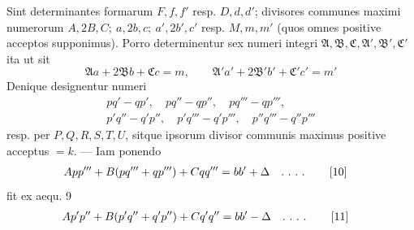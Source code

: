 Sint determinantes formarum $F,f,f'$ resp. $D,d,d'$; divisores communes maximi numerorum $A,2B,C;\ a,2b,c;\ a',2b',c'$ resp. $M,m,m'$ (quos omnes positive acceptos supponimus). Porro determinentur sex numeri integri $\mathfrak{A},\mathfrak{B},\mathfrak{C},\mathfrak{A}',\mathfrak{B}',\mathfrak{C}'$ ita ut sit
\[
\mathfrak{A}a+2\mathfrak{B}b+\mathfrak{C}c=m,\qquad
\mathfrak{A}'a'+2\mathfrak{B}'b'+\mathfrak{C}'c'=m'
\]
Denique designentur numeri
\[
\begin{gathered}pq'-qp',\quad pq''-qp'',\quad pq'''-qp''',\\p'q''-q'p'',\quad p'q'''-q'p''',\quad p''q'''-q''p'''\end{gathered}
\]
resp. per $P,Q,R,S,T,U$, sitque ipsorum divisor communis maximus positive acceptus $=k$. --- Iam ponendo
\begin{align*}
App'''+B(pq'''+qp''')+Cqq'''&=bb'+\Delta\quad\ldotp\,\ldotp\,\ldotp\,\ldotp\tag*{[10]}
\end{align*}
fit ex aequ. 9
\begin{align*}
Ap'p''+B(p'q''+q'p'')+Cq'q''&=bb'-\Delta\quad\ldotp\,\ldotp\,\ldotp\,\ldotp\tag*{[11]}
\end{align*}


